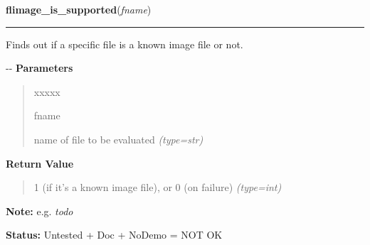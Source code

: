 \hspace{.8\funcindent}\begin{boxedminipage}{\funcwidth}

    \raggedright \textbf{flimage\_is\_supported}(\textit{fname})

    \vspace{-1.5ex}

    \rule{\textwidth}{0.5\fboxrule}
\setlength{\parskip}{2ex}

Finds out if a specific file is a known image file or not.

-{}-
\setlength{\parskip}{1ex}
      \textbf{Parameters}
      \vspace{-1ex}

      \begin{quote}
        \begin{Ventry}{xxxxx}

          \item[fname]


name of file to be evaluated
            {\it (type=str)}

        \end{Ventry}

      \end{quote}

      \textbf{Return Value}
    \vspace{-1ex}

      \begin{quote}

1 (if it's a known image file), or 0 (on failure)
      {\it (type=int)}

      \end{quote}

\textbf{Note:} 
e.g. \emph{todo}


\textbf{Status:} 
Untested + Doc + NoDemo = NOT OK


    \end{boxedminipage}

    \label{xformslib:flflimage:flimage_description_via_filter}

    \vspace{0.5ex}

